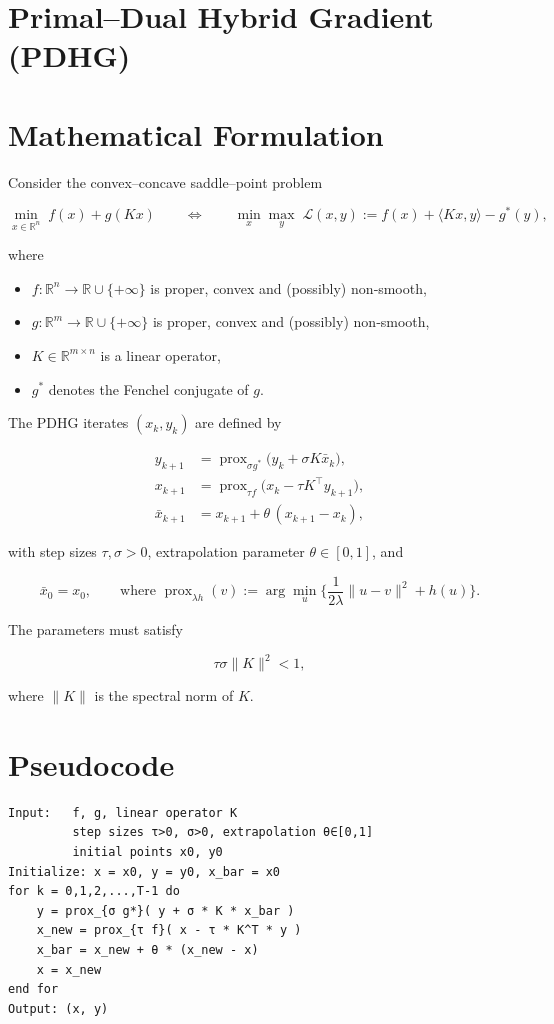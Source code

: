 \documentclass{article}
\newcommand{\prox}{\operatorname{prox}}
\begin{document}
\section*{Primal–Dual Hybrid Gradient (PDHG)}

\section*{Mathematical Formulation}
Consider the convex–concave saddle–point problem  

\[
\min_{x\in\mathbb{R}^{n}} \; f(x)+g(Kx)
\qquad\Longleftrightarrow\qquad
\min_{x}\max_{y}\; \mathcal{L}(x,y):=f(x)+\langle Kx,y\rangle-g^{*}(y),
\]

where  

\begin{itemize}
  \item $f:\mathbb{R}^{n}\!\to\!\mathbb{R}\cup\{+\infty\}$ is proper, convex and (possibly) non‑smooth,
  \item $g:\mathbb{R}^{m}\!\to\!\mathbb{R}\cup\{+\infty\}$ is proper, convex and (possibly) non‑smooth,
  \item $K\in\mathbb{R}^{m\times n}$ is a linear operator,
  \item $g^{*}$ denotes the Fenchel conjugate of $g$.
\end{itemize}

The PDHG iterates $(x_{k},y_{k})$ are defined by  

\[
\boxed{
\begin{aligned}
y_{k+1} &= \prox_{\sigma g^{*}}\!\bigl(y_{k}+\sigma K\bar{x}_{k}\bigr),\\[4pt]
x_{k+1} &= \prox_{\tau f}\!\bigl(x_{k}-\tau K^{\!\top}y_{k+1}\bigr),\\[4pt]
\bar{x}_{k+1} &= x_{k+1}+\theta\,(x_{k+1}-x_{k}),
\end{aligned}}
\tag{PDHG}
\]

with step sizes $\tau,\sigma>0$, extrapolation parameter $\theta\in[0,1]$, and  

\[
\bar{x}_{0}=x_{0},\qquad
\text{where } \prox_{\lambda h}(v):=\arg\min_{u}\Big\{\frac{1}{2\lambda}\|u-v\|^{2}+h(u)\Big\}.
\]

The parameters must satisfy  

\[
\tau\sigma\|K\|^{2}<1,
\tag{A1}
\]

where $\|K\|$ is the spectral norm of $K$.

\section*{Pseudocode}
\begin{verbatim}
Input:   f, g, linear operator K
         step sizes τ>0, σ>0, extrapolation θ∈[0,1]
         initial points x0, y0
Initialize: x = x0, y = y0, x_bar = x0
for k = 0,1,2,...,T-1 do
    y = prox_{σ g*}( y + σ * K * x_bar )
    x_new = prox_{τ f}( x - τ * K^T * y )
    x_bar = x_new + θ * (x_new - x)
    x = x_new
end for
Output: (x, y)
\end{verbatim}
\end{document}
